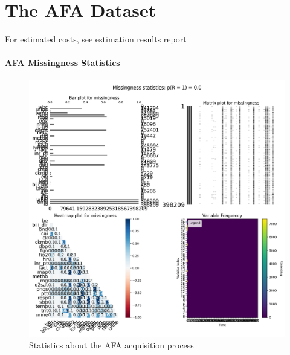 \usepackage{longtable}\section{The AFA Dataset}
For estimated costs, see estimation results report\paragraph{AFA Missingness Statistics}
\begin{figure}\centering\includegraphics[width=0.5 \textwidth]{img/gaussian_process_missingness_stats.png}\caption{Statistics about the AFA acquisition process}\label{fig:img/gaussian_process_missingness_stats.png}\end{figure}
